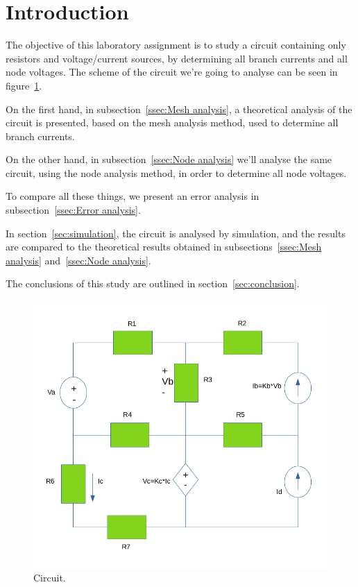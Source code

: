 \section{Introduction}
\label{sec:introduction}

\par The objective of this laboratory assignment is to study a circuit containing only resistors and voltage/current sources, by determining all branch currents and all node voltages.
The scheme of the circuit we're going to analyse can be seen in figure~\ref{fig:Cir}.
\par \noindent On the first hand, in subsection~\ref{ssec:Mesh analysis}, a theoretical analysis of the circuit is
presented, based on the mesh analysis method, used to determine all branch currents. 
\par \noindent On the other hand, in subsection~\ref{ssec:Node analysis} we'll analyse the same circuit, using the node analysis method, in order to determine all node voltages.
\par \noindent To compare all these things, we present an error analysis in subsection~\ref{ssec:Error analysis}.
\par \noindent In section~\ref{sec:simulation}, the circuit is analysed by simulation, and the results are compared to the theoretical results obtained in
subsections~\ref{ssec:Mesh analysis} and~\ref{ssec:Node analysis}. 
\par \noindent The conclusions of this study are outlined in section~\ref{sec:conclusion}.

\begin{figure}[ht] \centering
\includegraphics[width=0.8\linewidth]{Esquema_intro.png}
\caption{Circuit.}
\label{fig:Cir}
\end{figure}

